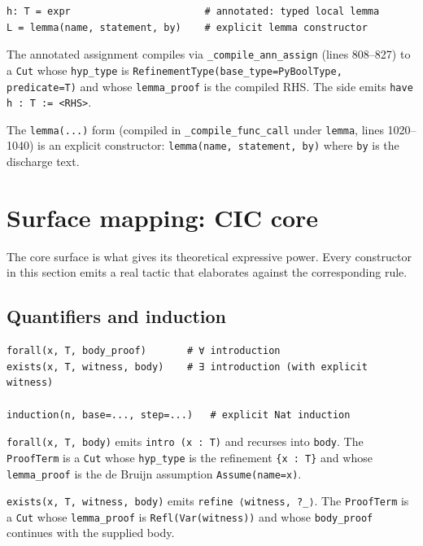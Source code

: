 \begin{lstlisting}[language=psdl]
h: T = expr                       # annotated: typed local lemma
L = lemma(name, statement, by)    # explicit lemma constructor
\end{lstlisting}

The annotated assignment compiles via \texttt{\_compile\_ann\_assign}
(lines 808--827) to a \texttt{Cut} whose
\texttt{hyp\_type} is \texttt{RefinementType(base\_type=PyBoolType,
predicate=T)} and whose \texttt{lemma\_proof} is the compiled RHS.
The \Lean{} side emits \verb|have h : T := <RHS>|.

The \texttt{lemma(...)} form (compiled in \texttt{\_compile\_func\_call}
under \texttt{lemma}, lines 1020--1040) is an explicit
constructor: \texttt{lemma(name, statement, by)} where \texttt{by} is
the discharge text.

\section{Surface mapping: CIC core}
\label{sec:psdl-cic}

The \CIC{} core surface is what gives \PSDL{} its theoretical
expressive power.  Every constructor in this section emits a real
\Lean{} tactic that elaborates against the corresponding \CIC{} rule.

\subsection{Quantifiers and induction}

\begin{lstlisting}[language=psdl]
forall(x, T, body_proof)       # ∀ introduction
exists(x, T, witness, body)    # ∃ introduction (with explicit witness)

induction(n, base=..., step=...)   # explicit Nat induction
\end{lstlisting}

\texttt{forall(x, T, body)} emits \verb|intro (x : T)| and recurses
into \texttt{body}.  The \texttt{ProofTerm} is a \texttt{Cut} whose
\texttt{hyp\_type} is the refinement \texttt{\{x : T\}} and whose
\texttt{lemma\_proof} is the de Bruijn assumption
\texttt{Assume(name=x)}.

\texttt{exists(x, T, witness, body)} emits
\verb|refine ⟨witness, ?_⟩|.  The \texttt{ProofTerm} is a
\texttt{Cut} whose \texttt{lemma\_proof} is \texttt{Refl(Var(witness))}
and whose \texttt{body\_proof} continues with the supplied body.

